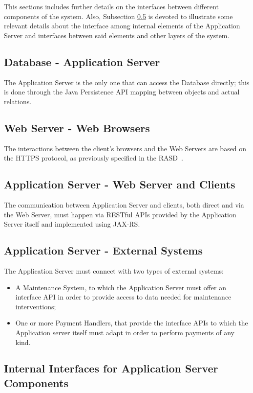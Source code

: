 This sections includes further details on the interfaces between different components of the system. Also, Subsection \ref{int_comps_if} is devoted to illustrate some relevant details about the interface among internal elements of the Application Server and interfaces between said elements and other layers of the system.

\subsection{Database - Application Server}
The Application Server is the only one that can access the Database directly; this is done through the Java Persistence API mapping between objects and actual relations.

\subsection{Web Server - Web Browsers}
The interactions between the client's browsers and the Web Servers are based on the HTTPS protocol, as previously specified in the RASD~\cite{rasd}.

\subsection{Application Server - Web Server and Clients}
The communication between Application Server and clients, both direct and via the Web Server, must happen via RESTful APIs provided by the Application Server itself and implemented using JAX-RS.

\subsection{Application Server - External Systems}
The Application Server must connect with two types of external systems:
\begin{itemize}
\item A Maintenance System, to which the Application Server must offer an interface API in order to provide access to data needed for maintenance interventions;
\item One or more Payment Handlers, that provide the interface APIs to which the Application server itself must adapt in order to perform payments of any kind.
\end{itemize}

\subsection{Internal Interfaces for Application Server Components}\label{int_comps_if}
